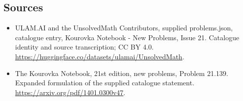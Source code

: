 \documentclass[11pt,a4paper]{article}
\begin{document}
\subsection{Sources}
\begin{itemize}
\item[S1] ULAM.AI and the UnsolvedMath Contributors, supplied problems.json, catalogue entry, Kourovka Notebook - New Problems, Issue 21. Catalogue identity and source transcription; CC BY 4.0.
\url{https://huggingface.co/datasets/ulamai/UnsolvedMath}.
\item[S2] The Kourovka Notebook, 21st edition, new problems, Problem 21.139. Expanded formulation of the supplied catalogue statement.
\url{https://arxiv.org/pdf/1401.0300v47}.
\end{itemize}
\end{document}
